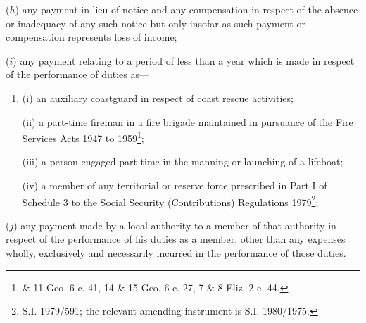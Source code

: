 \documentclass[12pt,a4paper]{article}
\begin{document}
\begin{enumerate}
($h$) any payment in lieu of notice and any compensation in respect of the absence or inadequacy of any such notice but only insofar as such payment or compensation represents loss of income;

($i$) any payment relating to a period of less than a year which is made in respect of the performance of duties as—
\begin{enumerate}\item[]
(i) an auxiliary coastguard in respect of coast rescue activities;

(ii) a part-time fireman in a fire brigade maintained in pursuance of the Fire Services Acts 1947 to 1959\footnote{ \& 11 Geo. 6 c. 41, 14 \& 15 Geo. 6 c. 27, 7 \& 8 Eliz. 2 c. 44.};

(iii) a person engaged part-time in the manning or launching of a lifeboat;

(iv) a member of any territorial or reserve force prescribed in Part I of Schedule 3 to the Social Security (Contributions) Regulations 1979\footnote{\frenchspacing S.I. 1979/591; the relevant amending instrument is S.I. 1980/1975.};
\end{enumerate}

($j$) any payment made by a local authority to a member of that authority in respect of the performance of his duties as a member, other than any expenses wholly, exclusively and necessarily incurred in the performance of those duties.
\end{enumerate}
\end{document}
